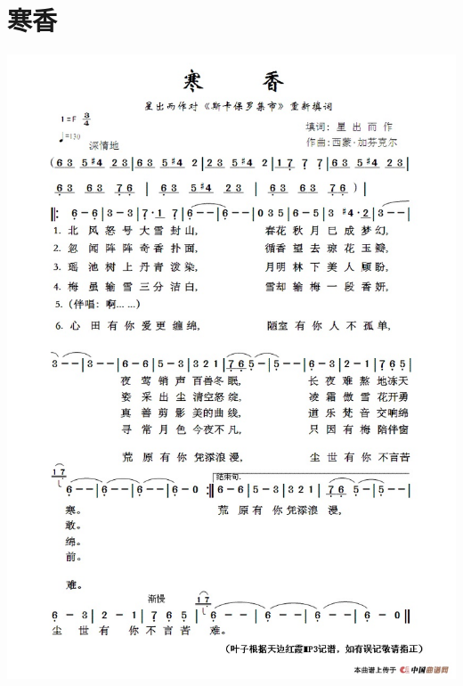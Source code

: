 \documentclass[cn,pad,chinese,chinesefont=nofont]{elegantbook}
\begin{document}
\section{寒香}
    \includegraphics[width=\textwidth]{dongxiao/20200323寒香.jpg}
    
\end{document}
